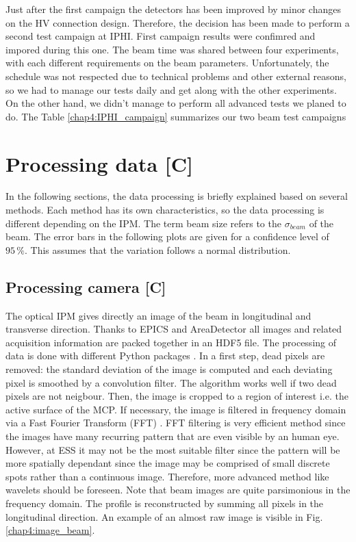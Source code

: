 \begin{refsection}
  

  Just after the first campaign the detectors has been improved by minor changes on the HV connection design. Therefore, the decision has been made to perform a second test campaign at IPHI.
  First campaign results were confimred and impored during this one.
  The beam time was shared between four experiments, with each different requirements on the beam parameters.
  Unfortunately, the schedule was not respected due to technical problems and other external reasons, so
  we had to manage our tests daily and get along with the other experiments.
  On the other hand, we didn't manage to perform all advanced tests we planed to do.
  The Table \ref{chap4:IPHI_campaign} summarizes our two beam test campaigns

  


  \section{Processing data [C]}
  In the following sections, the data processing is briefly explained based on several methods. Each method has its own characteristics, so the data processing is different depending on the IPM. The term beam size refers to the $\sigma_{beam}$ of the beam. The error bars in the following plots are given for a confidence level of $95\,\mathrm{\%}$. This assumes that the variation follows a normal distribution.

  \subsection{Processing camera [C]}
  The optical IPM gives directly an image of the beam in longitudinal and transverse direction. Thanks to EPICS and AreaDetector all images and related acquisition information are packed together in an HDF5 file. The processing of data is done with different Python packages \cite{NumPy2011,SciPy2019,Hunter2007}. In a first step, dead pixels are removed: the standard deviation of the image is computed and each deviating pixel is smoothed by a convolution filter. The algorithm works well if two dead pixels are not neigbour. Then, the image is cropped to a region of interest i.e. the active surface of the MCP.  If necessary, the image is filtered in frequency domain via a Fast Fourier Transform (FFT) \cite{Burrus2012}. FFT filtering is very efficient method since the images have many recurring pattern that are even visible by an human eye. However, at ESS it may not be the most suitable filter since the pattern will be more spatially dependant since the image may be comprised of small discrete spots rather than a continuous image. Therefore, more advanced method like wavelets \cite{Burrus1997,bultheel2014} should be foreseen. Note that beam images are quite parsimonious in the frequency domain. The profile is reconstructed by summing all pixels in the longitudinal direction. An example of an almost raw image is visible in Fig. \ref{chap4:image_beam}.


\end{refsection}
